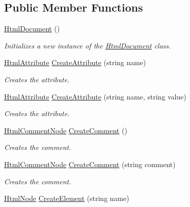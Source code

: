 \subsection*{Public Member Functions}
\begin{DoxyCompactItemize}
\item 
\hyperlink{class_html_agility_pack_1_1_html_document_a673cbe870195a2a6badbea6508a77ebe}{Html\+Document} ()
\begin{DoxyCompactList}\small\item\em Initializes a new instance of the \hyperlink{class_html_agility_pack_1_1_html_document}{Html\+Document} class. \end{DoxyCompactList}\item 
\hyperlink{class_html_agility_pack_1_1_html_attribute}{Html\+Attribute} \hyperlink{class_html_agility_pack_1_1_html_document_ab450c29d85b24ff097fab30efac72bc4}{Create\+Attribute} (string name)
\begin{DoxyCompactList}\small\item\em Creates the attribute. \end{DoxyCompactList}\item 
\hyperlink{class_html_agility_pack_1_1_html_attribute}{Html\+Attribute} \hyperlink{class_html_agility_pack_1_1_html_document_ac6eb06bcc4dff1f20584a625eea28f31}{Create\+Attribute} (string name, string value)
\begin{DoxyCompactList}\small\item\em Creates the attribute. \end{DoxyCompactList}\item 
\hyperlink{class_html_agility_pack_1_1_html_comment_node}{Html\+Comment\+Node} \hyperlink{class_html_agility_pack_1_1_html_document_a318060538be0d5308bc34c7a4aab4aba}{Create\+Comment} ()
\begin{DoxyCompactList}\small\item\em Creates the comment. \end{DoxyCompactList}\item 
\hyperlink{class_html_agility_pack_1_1_html_comment_node}{Html\+Comment\+Node} \hyperlink{class_html_agility_pack_1_1_html_document_a36a57131b52c2c568ebc5a4681fda518}{Create\+Comment} (string comment)
\begin{DoxyCompactList}\small\item\em Creates the comment. \end{DoxyCompactList}\item 
\hyperlink{class_html_agility_pack_1_1_html_node}{Html\+Node} \hyperlink{class_html_agility_pack_1_1_html_document_a0bf47c03adde8bcd9f5c163f0e6d44b9}{Create\+Element} (string name)

\end{DoxyCompactItemize}
